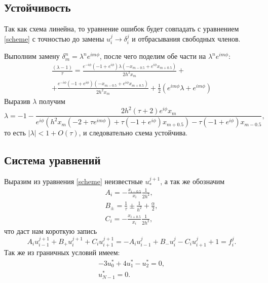 \documentclass[a4paper,12pt]{article}
\begin{document}
\subsection*{Устойчивость}

Так как схема линейна, то уравнение ошибок будет совпадать с уравнением \cref{scheme} с точностью до замены \(u_{i}^{j}\rightarrow\delta_{i}^{j}\) и отбрасывания свободных членов.

Выполним замену \(\delta_{m}^{n}=\lambda^{n} e^{i m \phi}\), после чего поделим обе части на \(\lambda^{n} e^{i m \phi}\):
\begin{multline*}
  \frac{(\lambda -1)}{\tau }=\frac{e^{-i \phi } \left(-1+e^{i \phi }\right) \lambda \left(-x_{m-0.5}+e^{i \phi } x_{m+0.5}\right)}{2 h^2 x_m}+\\
  +\frac{e^{-i\phi } \left(-1+e^{i \phi }\right) \left(-x_{m-0.5}+e^{i \phi } x_{m+0.5}\right)}{2 h^2 x_m}+\frac{1}{2} \left(e^{i m \phi } \lambda +e^{i m \phi }\right)
\end{multline*}
Выразив \(\lambda\) получим
\begin{equation*}
  \lambda=-1-\frac{2 h^2 (\tau +2) e^{i \phi } x_m}{e^{i \phi } \left(h^2 x_m \left(-2+\tau  e^{i m \phi }\right)+\tau  \left(-1+e^{i \phi }\right) x_{m+0.5}\right)-\tau \left(-1+e^{i \phi }\right) x_{m-0.5}},
\end{equation*}
то есть \(\left|\lambda\right| < 1 + O(\tau)\), и следовательно схема устойчива.

\subsection*{Система уравнений}

Выразим из уравнения \cref{scheme} неизвестные \(u_{*}^{j+1}\), а так же обозначим
\begin{gather*}
  A_{i} = -\frac{x_{i-0.5}}{x_{i}}\frac{1}{2h^2},\\
  B_{\pm} = \frac{1}{\tau}\pm\frac{1}{h^2}+\frac{\alpha}{2},\\
  C_{i} = -\frac{x_{i+0.5}}{x_{i}}\frac{1}{2h^2},
\end{gather*}
что даст нам короткую запись
\begin{equation}\label{eq}
  A_i u_{i-1}^{j+1} + B_{+} u_{i}^{j+1} + C_{i} u_{i+1}^{j+1} = -A_i u_{i-1}^{j} + B_{-} u_{i}^{j} - C_{i} u_{i+1}^{j} + 1 = f_{i}^{j}.
\end{equation}
Так же из граничных условий имеем:
\begin{gather}
  \label{cond}-3 u_{0}^{*} + 4u_{1}^{*}-u_{2}^{*}=0,\\
  u_{N-1}^{*}=0.
\end{gather}
\end{document}
